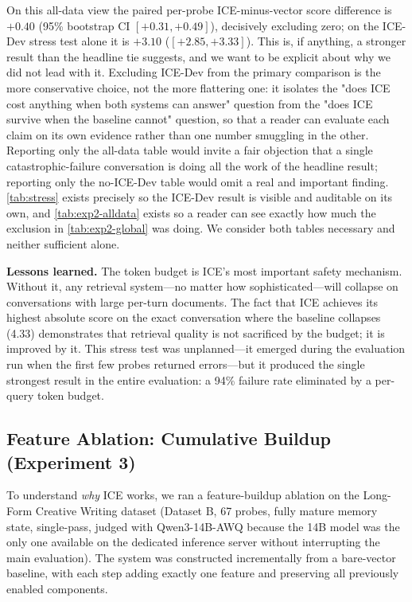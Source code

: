 \documentclass[11pt,a4paper]{article}
\begin{document}
On this all-data view the paired per-probe ICE-minus-vector score difference is $+0.40$ (95\% bootstrap CI $[+0.31, +0.49]$), decisively excluding zero; on the ICE-Dev stress test alone it is $+3.10$ ($[+2.85, +3.33]$). This is, if anything, a stronger result than the headline tie suggests, and we want to be explicit about why we did not lead with it. Excluding ICE-Dev from the primary comparison is the more conservative choice, not the more flattering one: it isolates the "does ICE cost anything when both systems can answer" question from the "does ICE survive when the baseline cannot" question, so that a reader can evaluate each claim on its own evidence rather than one number smuggling in the other. Reporting only the all-data table would invite a fair objection that a single catastrophic-failure conversation is doing all the work of the headline result; reporting only the no-ICE-Dev table would omit a real and important finding. \cref{tab:stress} exists precisely so the ICE-Dev result is visible and auditable on its own, and \cref{tab:exp2-alldata} exists so a reader can see exactly how much the exclusion in \cref{tab:exp2-global} was doing. We consider both tables necessary and neither sufficient alone.

\textbf{Lessons learned.} The token budget is ICE's most important safety mechanism. Without it, any retrieval system---no matter how sophisticated---will collapse on conversations with large per-turn documents. The fact that ICE achieves its highest absolute score on the exact conversation where the baseline collapses (4.33) demonstrates that retrieval quality is not sacrificed by the budget; it is improved by it. This stress test was unplanned---it emerged during the evaluation run when the first few probes returned errors---but it produced the single strongest result in the entire evaluation: a 94\% failure rate eliminated by a per-query token budget.

\subsection{Feature Ablation: Cumulative Buildup (Experiment 3)}
\label{sec:ablation}

To understand \emph{why} ICE works, we ran a feature-buildup ablation on the Long-Form Creative Writing dataset (Dataset B, 67 probes, fully mature memory state, single-pass, judged with Qwen3-14B-AWQ because the 14B model was the only one available on the dedicated inference server without interrupting the main evaluation). The system was constructed incrementally from a bare-vector baseline, with each step adding exactly one feature and preserving all previously enabled components.
\end{document}
